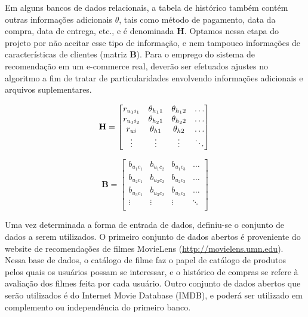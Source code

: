 Em alguns bancos de dados relacionais, a tabela de histórico também contém outras informações adicionais $\theta$, tais como método de pagamento, data da compra, data de entrega, etc., e é denominada $\mathbf{H}$. Optamos nessa etapa do projeto por não aceitar esse tipo de informação, e nem tampouco informações de  características de clientes (matriz $\mathbf{B}$). Para o emprego do sistema de recomendação em um e-commerce real, deverão ser efetuados ajustes no algoritmo a fim de tratar de particularidades envolvendo informações adicionais e arquivos suplementares.

\begin{equation} 
\mathbf{H} =
\begin{bmatrix} 
 r_{u_1 i_1} &  \theta_{h_1 1} &  \theta_{h_1 2} & \dots   \\
 r_{u_1 i_2} &  \theta_{h_2 1} &  \theta_{h_2 2} & \dots   \\
 r_{u i} &  \theta_{h 1} &  \theta_{h 2} & \dots   \\
 \vdots &  \vdots &  \vdots  & \ddots   \\
 \end{bmatrix} \\
\end{equation}

\begin{equation}
	\mathbf{B} = 
\begin{bmatrix} 
 b_{u_1 c_1} &  b_{u_1 c_2} &  b_{u_1 c_3}  & \dots   \\
 b_{u_2 c_1} &  b_{u_2 c_2} &  b_{u_2 c_3}  & \dots   \\
 b_{u_3 c_1} &  b_{u_3 c_2} &  b_{u_3 c_3}  & \dots  \\ 
 \vdots &  \vdots &  \vdots  & \ddots   \\
 \end{bmatrix}
\end{equation}

Uma vez determinada a forma de entrada de dados, definiu-se o conjunto de dados a serem utilizados. O primeiro conjunto de dados abertos é proveniente do website de recomendações de filmes MovieLens (\url{http://movielens.umn.edu}). Nessa base de dados, o catálogo de filme faz o papel de catálogo de produtos pelos quais os usuários possam se interessar, e o histórico de compras se refere à avaliação dos filmes feita por cada usuário. Outro conjunto de dados abertos que serão utilizados é do Internet Movie Database (IMDB), e poderá ser utilizado em complemento ou independência do primeiro banco.

